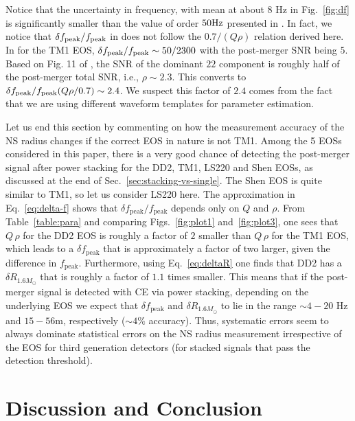\documentclass[prd,aps,floatfix,superscriptaddress,nofootinbib,twocolumn,10pt,English]{revtex4-1}
\begin{document}
Notice that the uncertainty in frequency, with mean at about $8$
Hz in Fig.~\ref{fig:df} is significantly smaller than the value of order $50 {\rm Hz}$ presented in
\cite{clark2016observing}.  
In fact, we notice that $\delta f_{\rm peak}/f_{\rm peak}$ in
\cite{clark2016observing} does not follow the $0.7 /(Q \rho)$ relation
derived here. In \cite{clark2016observing} for the TM1 EOS, $\delta
f_{\rm peak}/f_{\rm peak} \sim 50/2300$ with the post-merger SNR being
$5$. Based on Fig. 11 of \cite{clark2016observing}, the SNR of the
dominant $22$ component is roughly half of the post-merger total SNR,
i.e., $\rho \sim 2.3$. This converts to $\delta f_{\rm peak}/f_{\rm
  peak} (Q \rho/0.7) \sim 2.4 $.  We suspect this factor of $2.4$
comes from the fact that we are using different waveform templates for
parameter estimation. 



  


Let us end this section by commenting on how the measurement accuracy
of the NS radius changes if the correct EOS in nature is not
TM1. Among the 5 EOSs considered in this paper, there is a very good
chance of detecting the post-merger signal after power stacking for
the DD2, TM1, LS220 and Shen EOSs, as discussed at the end of
Sec.~\ref{sec:stacking-vs-single}. The Shen EOS is quite similar to
TM1, so let us consider LS220 here. The approximation in
Eq.~\eqref{eq:delta-f} shows that $\delta
f_\mathrm{peak}/f_\mathrm{peak}$ depends only on $Q$ and $\rho$. From
Table~\ref{table:para} and comparing Figs.~\ref{fig:plot1}
and~\ref{fig:plot3}, one sees that $Q \, \rho$ for the DD2 EOS is
roughly a factor of $2$ smaller than $Q \, \rho$ for the TM1 EOS,
which leads to a $\delta f_\mathrm{peak}$ that is approximately a
factor of two larger, given the difference in
$f_\mathrm{peak}$. Furthermore, using Eq.~\eqref{eq:deltaR} one finds
that DD2 has a $\delta R_{1.6 M_\odot}$ that is roughly a factor of
$1.1$ times smaller. This means that if the post-merger signal is
detected with CE via power stacking, depending on the underlying EOS
we expect that $\delta f_\mathrm{peak}$ and $\delta R_{1.6 M_\odot}$
to lie in the range $\sim 4-20$ Hz and $15-56$m, respectively ($\sim
4\%$ accuracy). Thus, systematic errors seem to always dominate
statistical errors on the NS radius measurement irrespective of the
EOS for third generation detectors (for stacked signals that pass the
detection threshold).

\section{Discussion and Conclusion}\label{sec5}
\end{document}
